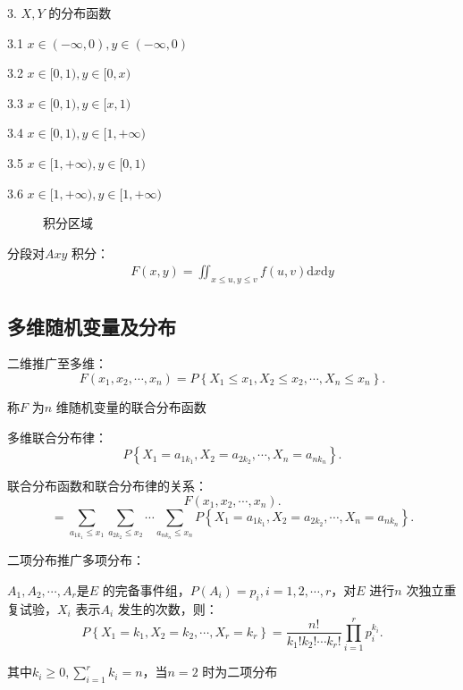 \begin{eg}
\begin{figure}[htbp]
    \end{figure}

    3. $X,Y$ 的分布函数

    3.1 $x\in (-\infty,0), y\in (-\infty,0)$

    3.2 $x\in [0,1), y\in [0,x)$ 

    3.3 $x\in [0,1), y\in [x,1)$ 

    3.4 $x\in [0,1), y\in [1,+\infty)$ 

    3.5 $x\in [1,+\infty), y\in [0,1)$ 

    3.6 $x\in [1,+\infty), y\in [1,+\infty)$ 
    \begin{figure}[ht]
        \centering
        \caption{积分区域}
        \label{fig:积分区域}
    \end{figure}
    分段对$Axy$ 积分：
    \begin{align*}
        F\left( x,y \right) =\iint_{x\le u,y\le v} f\left( u,v \right)  \mathrm{d}x\mathrm{d}y
    \end{align*}
\end{eg}
\subsection{多维随机变量及分布}%
\label{sub:多维随机变量及分布}
\begin{defi}
    二维推广至多维：
    \[
        F\left( x_1,x_2,\cdots,x_n \right) =P\left\{ X_1\le x_1,X_2\le x_2,\cdots,X_n\le x_n \right\} 
    .\] 

    称$F$ 为$n$ 维随机变量的联合分布函数
\end{defi}
\begin{defi}
    多维联合分布律：
    \[
        P\left\{ X_1=a_{1k_1},X_2=a_{2k_2},\cdots,X_n=a_{nk_n} \right\} 
    .\] 
\end{defi}
联合分布函数和联合分布律的关系：\[
    F\left( x_1,x_2,\cdots,x_n \right) 
.\]
\[
    =\sum_{a_{1k_1}\le x_1}\sum_{a_{2k_2}\le x_2}\cdots \sum_{a_{nk_n}\le x_{n}} P\left\{ X_1=a_{1k_1},X_2=a_{2k_2},\cdots,X_n=a_{nk_n} \right\} 
.\] 
\begin{notation}
    二项分布推广多项分布：

    $A_1,A_2,\cdots,A_r$是$E$ 的完备事件组，$P\left( A_i \right) =p_i,i=1,2,\cdots,r$，对$E$ 进行$n$ 次独立重复试验，$X_{i}$ 表示$A_{i}$ 发生的次数，则：\[
        P\left\{ X_1=k_1,X_2=k_2,\cdots,X_r=k_r \right\} =\frac{n!}{k_1!k_2!\cdots k_r!}\prod_{i=1}^{r} p_{i}^{k_i} 
    .\] 

    其中$k_i\ge 0,{\sum_{i=1}^{r} k_i=n}$，当$n=2$ 时为二项分布
\end{notation}

